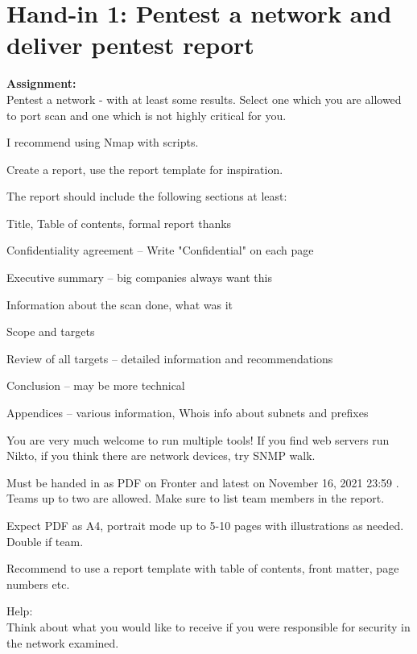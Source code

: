 \documentclass[a4paper,11pt,notitlepage]{report}
\begin{document}
\rm
{}

\newcommand{\course}[1]{KEA Kompetence Penetration Testing\\ exercises}




\setcounter{tocdepth}{0}

\normal

\chapter*{Hand-in 1: Pentest a network and deliver pentest report}

{\bf Assignment:}\\
Pentest a network - with at least some results.
Select one which you are allowed to port scan and one which is not highly critical for you.

I recommend using Nmap with scripts.

Create a report, use the report template for inspiration.

The report should include the following sections at least:
\begin{list2}
\item Title, Table of contents, formal report thanks
\item Confidentiality agreement -- Write "Confidential" on each page
\item Executive summary -- big companies always want this
\item Information about the scan done, what was it
\item Scope and targets
\item Review of all targets -- detailed information and recommendations
\item Conclusion -- may be more technical
\item Appendices -- various information, Whois info about subnets and prefixes
\end{list2}

You are very much welcome to run multiple tools! If you find web servers run Nikto, if you think there are network devices, try SNMP walk.

Must be handed in as PDF on Fronter and latest on November 16, 2021 23:59 . Teams up to two are allowed. Make sure to list team members in the report.

Expect PDF as A4, portrait mode up to 5-10 pages with illustrations as needed. Double if team.

Recommend to use a report template with table of contents, front matter, page numbers etc.


Help:\\
Think about what you would like to receive if you were responsible for security in the network examined.
\end{document}
